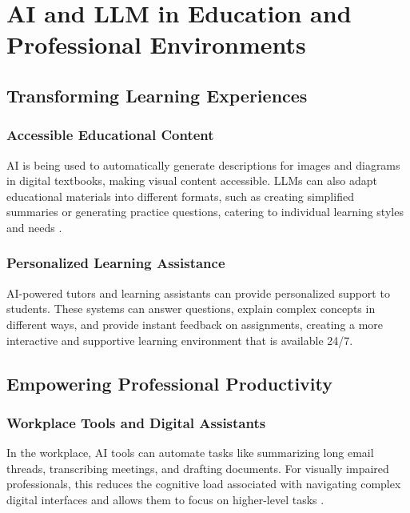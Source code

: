 \section{AI and LLM in Education and Professional Environments}\label{ch9:sec:education-professional}

\subsection{Transforming Learning Experiences}\label{ch9:ssec:learning-experiences}

\subsubsection{Accessible Educational Content}\label{ch9:sssec:accessible-content}
AI is being used to automatically generate descriptions for images and diagrams in digital textbooks, making visual content accessible. LLMs can also adapt educational materials into different formats, such as creating simplified summaries or generating practice questions, catering to individual learning styles and needs \supercite{Bigham2014, MicrosoftAIAccessibility, GoogleMLAccessibility}.

\subsubsection{Personalized Learning Assistance}\label{ch9:sssec:personalized-learning}
AI-powered tutors and learning assistants can provide personalized support to students. These systems can answer questions, explain complex concepts in different ways, and provide instant feedback on assignments, creating a more interactive and supportive learning environment that is available 24/7.

\subsection{Empowering Professional Productivity}\label{ch9:ssec:professional-productivity}

\subsubsection{Workplace Tools and Digital Assistants}\label{ch9:sssec:workplace-tools}
In the workplace, AI tools can automate tasks like summarizing long email threads, transcribing meetings, and drafting documents. For visually impaired professionals, this reduces the cognitive load associated with navigating complex digital interfaces and allows them to focus on higher-level tasks \supercite{MicrosoftAccessibility, MicrosoftCopilotFeatures, MicrosoftCopilotTech}.

